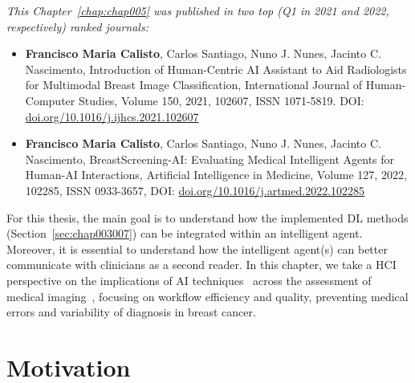 \clearpage
\label{chap:chap005}

\vspace{0.05mm}

\noindent
{\it This Chapter~\ref{chap:chap005} was published in two top (Q1 in 2021 and 2022, respectively) ranked journals:}

\vspace{0.05mm}

\begin{itemize}
\item {\bf Francisco Maria Calisto}, Carlos Santiago, Nuno J. Nunes, Jacinto C. Nascimento, Introduction of Human-Centric AI Assistant to Aid Radiologists for Multimodal Breast Image Classification, International Journal of Human-Computer Studies, Volume 150, 2021, 102607, ISSN 1071-5819. DOI: \href{https://doi.org/10.1016/j.ijhcs.2021.102607}{doi.org/10.1016/j.ijhcs.2021.102607}
\item {\bf Francisco Maria Calisto}, Carlos Santiago, Nuno J. Nunes, Jacinto C. Nascimento, BreastScreening-AI: Evaluating Medical Intelligent Agents for Human-AI Interactions, Artificial Intelligence in Medicine, Volume 127, 2022, 102285, ISSN 0933-3657, DOI: \href{https://doi.org/10.1016/j.artmed.2022.102285}{doi.org/10.1016/j.artmed.2022.102285}
\end{itemize}

For this thesis, the main goal is to understand how the implemented \ac{DL} methods (Section~\ref{sec:chap003007}) can be integrated within an intelligent agent.
Moreover, it is essential to understand how the intelligent agent(s) can better communicate with clinicians as a second reader.
In this chapter, we take a \ac{HCI} perspective on the implications of \ac{AI} techniques~\cite{CALISTO2022102285} across the assessment of medical imaging~\cite{CALISTO2021102607}, focusing on workflow efficiency and quality, preventing medical errors and variability of diagnosis in breast cancer.

\section{Motivation}
\label{sec:chap005001}

